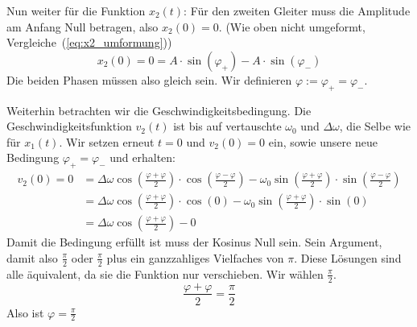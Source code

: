 \documentclass{article}
\begin{document}
                  Nun weiter für die Funktion \(x_2(t)\):
                  Für den zweiten Gleiter muss die Amplitude am Anfang Null betragen, also \( x_2(0) = 0\). (Wie oben nicht umgeformt, Vergleiche~(\ref{eq:x2_umformung}))
                  \begin{equation}
                      x_2(0) = 0 = A \cdot \sin \left( \varphi_{+} \right) - A \cdot \sin \left( \varphi_{-} \right)
                  \end{equation}
                  Die beiden Phasen müssen also gleich sein. Wir definieren \(\varphi := \varphi_{+} = \varphi_{-}\).

                  Weiterhin betrachten wir die Geschwindigkeitsbedingung.
                  Die Geschwindigkeitsfunktion \(v_2(t)\) ist bis auf vertauschte \( \omega_0 \) und \( \Delta \omega \), die Selbe wie für \( x_1(t) \).
                  Wir setzen erneut \(t = 0\) und \( v_2(0) = 0 \) ein, sowie unsere neue Bedingung \( \varphi_{+} = \varphi_{-} \) und erhalten:
                  \begin{equation}
                      \begin{aligned}
                          v_2(0) = 0 & = \Delta \omega \cos \left( \frac{\varphi + \varphi }{2} \right) \cdot \cos \left( \frac{\varphi - \varphi }{2} \right) - \omega_0 \sin \left( \frac{\varphi + \varphi }{2} \right) \cdot \sin \left( \frac{\varphi - \varphi }{2} \right) \\
                                     & = \Delta \omega \cos \left( \frac{\varphi + \varphi }{2} \right) \cdot \cos \left( 0 \right) - \omega_0 \sin \left( \frac{\varphi + \varphi }{2} \right) \cdot \sin \left( 0 \right)                                                       \\
                                     & = \Delta \omega \cos \left( \frac{\varphi + \varphi }{2} \right) - 0
                      \end{aligned}
                  \end{equation}
                  Damit die Bedingung erfüllt ist muss der Kosinus Null sein. Sein Argument, damit also \( \frac{\pi}{2}\) oder \( \frac{\pi}{2}\) plus ein ganzzahliges Vielfaches von \(\pi\).
                  Diese Lösungen sind alle äquivalent, da sie die Funktion nur verschieben. Wir wählen \( \frac{\pi}{2} \).
                  \begin{equation}
                      \frac{ \varphi + \varphi }{ 2 } = \frac{\pi}{2}
                  \end{equation}
                  Also ist \(\varphi = \frac{\pi}{2} \)
\end{document}
